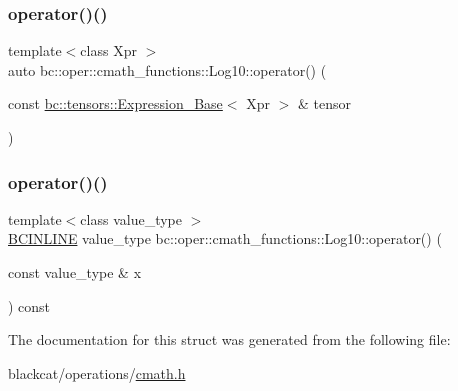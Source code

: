 \mbox{\label{structbc_1_1oper_1_1cmath__functions_1_1Log10_a2ff90defda2fbbd87d4dd4135bd6bfe7}} 
\subsubsection{\texorpdfstring{operator()()}{operator()()}\hspace{0.1cm}{\footnotesize\ttfamily [2/3]}}
{\footnotesize\ttfamily template$<$class Xpr $>$ \\
auto bc\+::oper\+::cmath\+\_\+functions\+::\+Log10\+::operator() (\begin{DoxyParamCaption}\item[{const \hyperlink{classbc_1_1tensors_1_1Expression__Base}{bc\+::tensors\+::\+Expression\+\_\+\+Base}$<$ Xpr $>$ \&}]{tensor }\end{DoxyParamCaption})\hspace{0.3cm}{\ttfamily [inline]}}

\mbox{\label{structbc_1_1oper_1_1cmath__functions_1_1Log10_ae07c8e819aa6e8977c29f4a75bfad381}} 
\subsubsection{\texorpdfstring{operator()()}{operator()()}\hspace{0.1cm}{\footnotesize\ttfamily [3/3]}}
{\footnotesize\ttfamily template$<$class value\+\_\+type $>$ \\
\hyperlink{common_8h_a6699e8b0449da5c0fafb878e59c1d4b1}{B\+C\+I\+N\+L\+I\+NE} value\+\_\+type bc\+::oper\+::cmath\+\_\+functions\+::\+Log10\+::operator() (\begin{DoxyParamCaption}\item[{const value\+\_\+type \&}]{x }\end{DoxyParamCaption}) const\hspace{0.3cm}{\ttfamily [inline]}}



The documentation for this struct was generated from the following file\+:\begin{DoxyCompactItemize}
\item 
blackcat/operations/\hyperlink{cmath_8h}{cmath.\+h}\end{DoxyCompactItemize}
